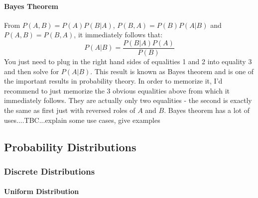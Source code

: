 





\paragraph{Bayes Theorem}
From $P(A, B) = P(A) P(B|A)$,  $P(B, A) = P(B) P(A|B)$ and $P(A, B) = P(B, A)$, it immediately follows that:
\begin{equation}
\label{Eq:BayesTheorem}
 P(A|B) = \frac{P(B|A) P(A)}{P(B)}
\end{equation}
You just need to plug in the right hand sides of equalities 1 and 2 into equality 3 and then solve for $ P(A|B)$. This result is known as Bayes theorem and is one of the important results in probability theory. In order to memorize it, I'd recommend to just memorize the 3 obvious equalities above from which it immediately follows. They are actually only two equalities - the second is exactly the same as first just with reversed roles of $A$ and $B$. Bayes theorem has a lot of uses....TBC...explain some use cases, give examples






\subsection{Probability Distributions}


\subsubsection{Discrete Distributions}

\paragraph{Uniform Distribution}

